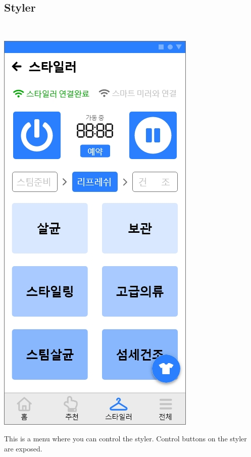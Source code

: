 \documentclass[conference]{IEEEtran}
\begin{document}
\subsection{Styler}  \\ 
\centerline{\includegraphics[scale=0.32]{스타일러4.jpg}}
This is a menu where you can control the styler. Control buttons on the styler are exposed.
\end{document}
